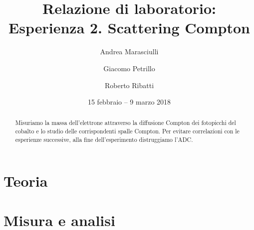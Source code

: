 \documentclass[a4paper]{article}
\title{Relazione di laboratorio:\\
Esperienza 2. Scattering Compton}
\author{Andrea Marasciulli
\and Giacomo Petrillo
\and Roberto Ribatti}
\date{15 febbraio -- 9 marzo 2018}
\begin{document}
\maketitle

\begin{abstract}
	Misuriamo la massa dell'elettrone attraverso la diffusione Compton dei fotopicchi del cobalto e lo studio delle corrispondenti spalle Compton.
	Per evitare correlazioni con le esperienze successive,
	alla fine dell'esperimento distruggiamo l'ADC.
\end{abstract}

{\small \tableofcontents}

\newpage

%

\section{Teoria}





\section{Misura e analisi}





%
\end{document}
